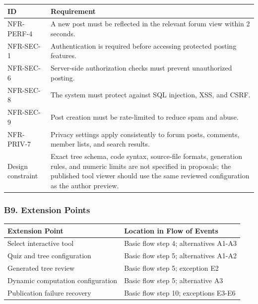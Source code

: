 \documentclass[12pt]{article}
\renewcommand{\baselinestretch}{1.5}
\begin{document}
\begingroup
\small
\renewcommand{\baselinestretch}{1.0}\selectfont
\renewcommand{\arraystretch}{1.15}
\setlength{\tabcolsep}{6pt}
\begin{longtable}{|>{\raggedright\arraybackslash}p{}|>{\raggedright\arraybackslash}p{}|}
\hline
\textbf{ID} & \textbf{Requirement} \\ \hline
\endhead
NFR-PERF-4 & A new post must be reflected in the relevant forum view within 2 seconds. \\ \hline
NFR-SEC-1 & Authentication is required before accessing protected posting features. \\ \hline
NFR-SEC-6 & Server-side authorization checks must prevent unauthorized posting. \\ \hline
NFR-SEC-8 & The system must protect against SQL injection, XSS, and CSRF. \\ \hline
NFR-SEC-9 & Post creation must be rate-limited to reduce spam and abuse. \\ \hline
NFR-PRIV-7 & Privacy settings apply consistently to forum posts, comments, member lists, and search results. \\ \hline
Design constraint & Exact tree schema, code syntax, source-file formats, generation rules, and numeric limits are not specified in proposals; the published tool viewer should use the same reviewed configuration as the author preview. \\ \hline
\end{longtable}
\endgroup
\par\medskip

\hypertarget{sec:b9-extension-points}{}
\subsubsection*{B9. Extension Points}
\par\medskip

\begingroup
\small
\renewcommand{\baselinestretch}{1.0}\selectfont
\renewcommand{\arraystretch}{1.15}
\setlength{\tabcolsep}{6pt}
\begin{longtable}{|>{\raggedright\arraybackslash}p{}|>{\raggedright\arraybackslash}p{}|}
\hline
\textbf{Extension Point} & \textbf{Location in Flow of Events} \\ \hline
\endhead
Select interactive tool & Basic flow step 4; alternatives A1-A3 \\ \hline
Quiz and tree configuration & Basic flow step 5; alternatives A1-A2 \\ \hline
Generated tree review & Basic flow step 5; exception E2 \\ \hline
Dynamic computation configuration & Basic flow step 5; alternative A3 \\ \hline
Publication failure recovery & Basic flow step 10; exceptions E3-E6 \\ \hline
\end{longtable}
\endgroup
\par\medskip
\end{document}
